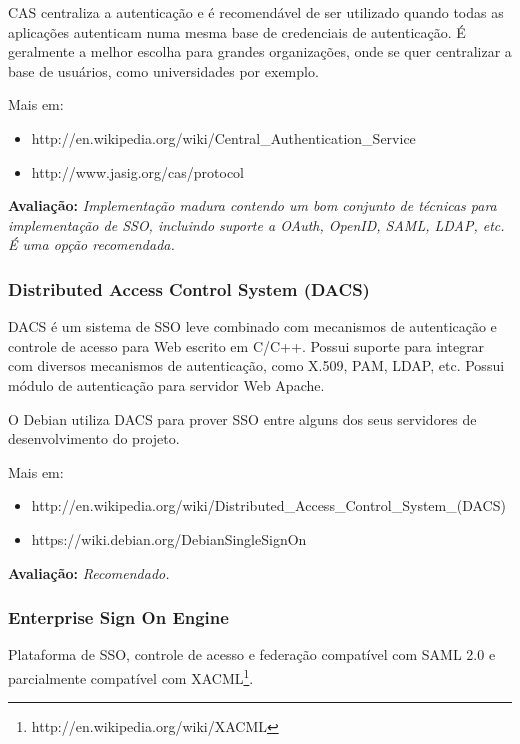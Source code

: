 \documentclass[11pt]{article}
\begin{document}
CAS centraliza a autenticação e é recomendável de ser utilizado quando todas
as aplicações autenticam numa mesma base de credenciais de autenticação. É
geralmente a melhor escolha para grandes organizações, onde se quer
centralizar a base de usuários, como universidades por exemplo.

Mais em:
\begin{itemize}
  \item{http://en.wikipedia.org/wiki/Central\_Authentication\_Service}
  \item{http://www.jasig.org/cas/protocol}
\end{itemize}

{\bf Avaliação:} {\it Implementação madura contendo um bom conjunto de
técnicas para implementação de SSO, incluindo suporte a OAuth, OpenID, SAML, LDAP,
etc. É uma opção recomendada.}

\subsubsection{Distributed Access Control System (DACS)}

DACS é um sistema de SSO leve combinado com mecanismos de autenticação e
controle de acesso para Web escrito em C/C++. Possui suporte para integrar com
diversos mecanismos de autenticação, como X.509, PAM, LDAP, etc. Possui módulo
de autenticação para servidor Web Apache.


O Debian utiliza DACS para prover SSO entre alguns dos seus servidores de
desenvolvimento do projeto.

Mais em:
\begin{itemize}
  \item{http://en.wikipedia.org/wiki/Distributed\_Access\_Control\_System\_(DACS)}
  \item{https://wiki.debian.org/DebianSingleSignOn}
\end{itemize}

{\bf Avaliação:} {\it Recomendado.}

\subsubsection{Enterprise Sign On Engine}

Plataforma de SSO, controle de acesso e federação compatível com SAML 2.0
e parcialmente compatível com
XACML\footnote{http://en.wikipedia.org/wiki/XACML}.
\end{document}
